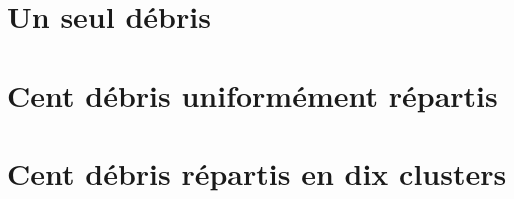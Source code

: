 \section{Un seul débris}



\section{Cent débris uniformément répartis}



\section{Cent débris répartis en dix clusters}

